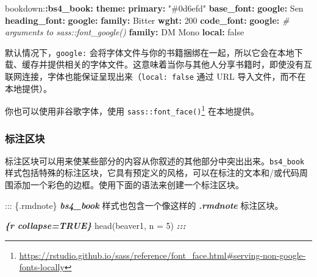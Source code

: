 \documentclass[
  12pt,
]{krantz}
\newenvironment{Shaded}{\begin{snugshade}}{\end{snugshade}}
\newcommand{\AttributeTok}[1]{\textcolor[rgb]{0.13,0.29,0.53}{#1}}
\newcommand{\CharTok}[1]{\textcolor[rgb]{0.31,0.60,0.02}{#1}}
\newcommand{\CommentTok}[1]{\textcolor[rgb]{0.56,0.35,0.01}{\textit{#1}}}
\newcommand{\DecValTok}[1]{\textcolor[rgb]{0.00,0.00,0.81}{#1}}
\newcommand{\FunctionTok}[1]{\textcolor[rgb]{0.13,0.29,0.53}{\textbf{#1}}}
\newcommand{\InformationTok}[1]{\textcolor[rgb]{0.56,0.35,0.01}{\textbf{\textit{#1}}}}
\newcommand{\KeywordTok}[1]{\textcolor[rgb]{0.13,0.29,0.53}{\textbf{#1}}}
\newcommand{\NormalTok}[1]{#1}
\newcommand{\StringTok}[1]{\textcolor[rgb]{0.31,0.60,0.02}{#1}}
\renewcommand{\href}[2]{#2\footnote{\url{#1}}}
\theoremstyle{definition}
\theoremstyle{definition}
\theoremstyle{definition}
\theoremstyle{definition}
\theoremstyle{remark}
\begin{document}
\begin{Shaded}
\begin{Highlighting}[]
\AttributeTok{bookdown:}\FunctionTok{:bs4\_book}\KeywordTok{:}
\AttributeTok{  }\FunctionTok{theme}\KeywordTok{:}
\AttributeTok{    }\FunctionTok{primary}\KeywordTok{:}\AttributeTok{ }\StringTok{"\#0d6efd"}\AttributeTok{   }
\AttributeTok{    }\FunctionTok{base\_font}\KeywordTok{:}\AttributeTok{ }
\AttributeTok{      }\FunctionTok{google}\KeywordTok{:}\AttributeTok{ Sen}
\AttributeTok{    }\FunctionTok{heading\_font}\KeywordTok{:}
\AttributeTok{      }\FunctionTok{google}\KeywordTok{:}
\AttributeTok{        }\FunctionTok{family}\KeywordTok{:}\AttributeTok{ Bitter}
\AttributeTok{        }\FunctionTok{wght}\KeywordTok{:}\AttributeTok{ }\DecValTok{200}
\AttributeTok{    }\FunctionTok{code\_font}\KeywordTok{:}
\AttributeTok{      }\FunctionTok{google}\KeywordTok{:}\AttributeTok{ }
\CommentTok{        \# arguments to sass::font\_google() }
\AttributeTok{        }\FunctionTok{family}\KeywordTok{:}\AttributeTok{ DM Mono}
\AttributeTok{        }\FunctionTok{local}\KeywordTok{:}\AttributeTok{ }\CharTok{false}
\end{Highlighting}
\end{Shaded}

默认情况下，\texttt{google:} 会将字体文件与你的书籍捆绑在一起，所以它会在本地下载、缓存并提供相关的字体文件。这意味着当你与其他人分享书籍时，即使没有互联网连接，字体也能保证呈现出来（\texttt{local:\ false} 通过 URL 导入文件，而不在本地提供）。

你也可以使用非谷歌字体，使用 \href{https://rstudio.github.io/sass/reference/font_face.html\#serving-non-google-fonts-locally}{\texttt{sass::font\_face()}} 在本地提供。

\subsubsection{标注区块}\label{ux6807ux6ce8ux533aux5757}

标注区块可以用来使某些部分的内容从你叙述的其他部分中突出出来。\texttt{bs4\_book} 样式包括特殊的标注区块，它具有预定义的风格，可以在标注的文本和/或代码周围添加一个彩色的边框。使用下面的语法来创建一个标注区块。

\begin{Shaded}
\begin{Highlighting}[]
\NormalTok{::: \{.rmdnote\}}
\InformationTok{\textasciigrave{}bs4\_book\textasciigrave{}}\NormalTok{ 样式也包含一个像这样的 }\InformationTok{\textasciigrave{}.rmdnote\textasciigrave{}} 
\NormalTok{标注区块。}

\NormalTok{\textasciigrave{}\textasciigrave{}}\InformationTok{\textasciigrave{}\{r collapse=TRUE\}\textasciigrave{}}
\NormalTok{head(beaver1, n = 5)}
\InformationTok{\textasciigrave{}\textasciigrave{}\textasciigrave{}}
\InformationTok{:::}
\end{Highlighting}
\end{Shaded}
\end{document}
